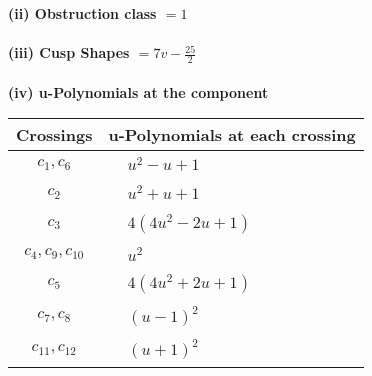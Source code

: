 \documentclass[1p]{elsarticle_modified}
\theoremstyle{definition}
\begin{document}
\flushleft \textbf{(ii) Obstruction class $= 1$}\\~\\
\flushleft \textbf{(iii) Cusp Shapes $= 7 v-\frac{25}{2}$}\\~\\
\newpage\renewcommand{\arraystretch}{1}
\flushleft \textbf{(iv) u-Polynomials at the component}\newline \\
\begin{tabular}{m{50pt}|m{274pt}}
Crossings & \hspace{64pt}u-Polynomials at each crossing \\
\hline $$\begin{aligned}c_{1},c_{6}\end{aligned}$$&$\begin{aligned}
&u^2- u+1
\end{aligned}$\\
\hline $$\begin{aligned}c_{2}\end{aligned}$$&$\begin{aligned}
&u^2+u+1
\end{aligned}$\\
\hline $$\begin{aligned}c_{3}\end{aligned}$$&$\begin{aligned}
&4(4 u^2-2 u+1)
\end{aligned}$\\
\hline $$\begin{aligned}c_{4},c_{9},c_{10}\end{aligned}$$&$\begin{aligned}
&u^2
\end{aligned}$\\
\hline $$\begin{aligned}c_{5}\end{aligned}$$&$\begin{aligned}
&4(4 u^2+2 u+1)
\end{aligned}$\\
\hline $$\begin{aligned}c_{7},c_{8}\end{aligned}$$&$\begin{aligned}
&(u-1)^2
\end{aligned}$\\
\hline $$\begin{aligned}c_{11},c_{12}\end{aligned}$$&$\begin{aligned}
&(u+1)^2
\end{aligned}$\\
\hline
\end{tabular}\\~\\
\end{document}
